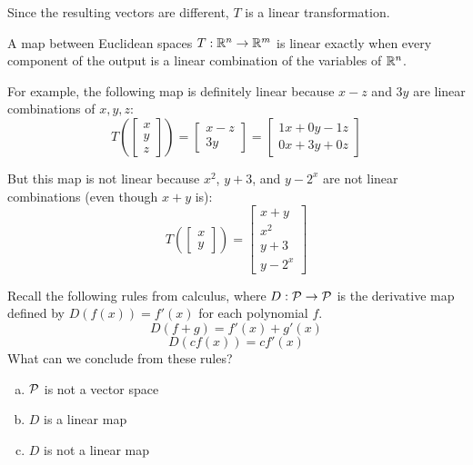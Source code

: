 \begin{applicationActivities}
\begin{example}
Since the resulting vectors are different,
\(T\) is a linear transformation.
\end{example}

\begin{fact}
A map between Euclidean spaces \(T:\IR^n\to\IR^m\) is linear
exactly when every component of the output is a linear combination
of the variables of \(\IR^n\).

\vspace{1em}

For example, the following map is definitely linear
because \(x-z\) and \(3y\) are linear combinations of \(x,y,z\):
\[
  T\left(\begin{bmatrix} x \\ y \\ z \end{bmatrix} \right)
=
  \begin{bmatrix} x-z \\ 3y \end{bmatrix}
=
  \begin{bmatrix} 1x+0y-1z \\ 0x+3y+0z \end{bmatrix}
\]

But this map is not linear because \(x^2\), \(y+3\), and \(y-2^x\)
are not linear combinations (even though \(x+y\) is):
\[
  T\left(\begin{bmatrix} x \\ y \end{bmatrix} \right)
=
  \begin{bmatrix} x+y \\ x^2 \\ y+3 \\ y-2^x \end{bmatrix}
\]
\end{fact}

\begin{activity}{5}
  Recall the following rules from calculus, where \(D:\P\to\P\)
  is the derivative map defined by \(D(f(x))=f'(x)\) for each
  polynomial \(f\).
  \[
    D(f+g)=f'(x)+g'(x)
  \]
  \[
    D(cf(x))=cf'(x)
  \]
  What can we conclude from these rules?
  \begin{enumerate}[a)]
    \item \(\P\) is not a vector space
    \item \(D\) is a linear map
    \item \(D\) is not a linear map
  \end{enumerate}
\end{activity}



\end{applicationActivities}
